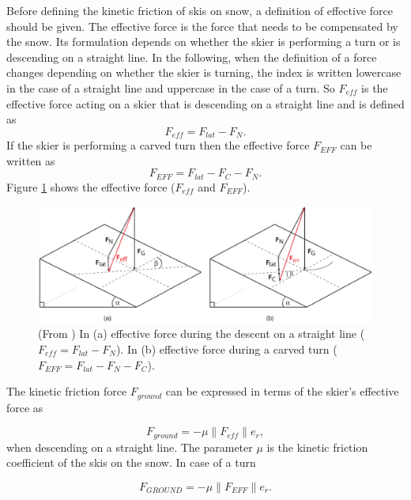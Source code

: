 \documentclass[12pt,a4paper,twoside]{book}
\newcommand{\norm}[1]{\lVert#1\rVert}
\begin{document}
Before defining the kinetic friction of skis on snow, a definition of effective force should be given. The effective force is the force that needs to be compensated by the snow. Its formulation depends on whether the skier is performing a turn or is descending on a straight line. In the following, when the definition of a force changes depending on whether the skier is turning, the index is written lowercase in the case of a straight line and uppercase in the case of a turn. So $F_{eff}$ is the effective force acting on a skier that is descending on a straight line and is defined as
\begin{equation}
F_{eff}=F_{lat}-F_N.
\end{equation}
If the skier is performing a carved turn then the effective force $F_{EFF}$ can be written as
\begin{equation}
F_{EFF}=F_{lat}-F_C-F_N.
\end{equation}
Figure \ref{effective_force_pic} shows the effective force ($F_{eff}$ and $F_{EFF}$).

\begin{figure}
  \begin{center}
    \includegraphics[width=\textwidth]{images/figure6.eps}
    \caption{(From \cite{hol2012}) In (a) effective force during the descent on a straight line ($F_{eff}=F_{lat}-F_N$). In (b) effective force during a carved turn ($F_{EFF}=F_{lat}-F_N-F_C$).}\label{effective_force_pic}
  \end{center}
\end{figure}

The kinetic friction force $F_{ground}$ can be expressed in terms of the skier's effective force as

\begin{equation}
F_{ground}=-\mu \norm{F_{eff}}e_{\dot{r}},
\end{equation}
when descending on a straight line. The parameter $\mu$ is the kinetic friction coefficient of the skis on the snow. In case of a turn

\begin{equation}
F_{GROUND}=-\mu \norm{F_{EFF}}e_{\dot{r}}.
\end{equation}
\end{document}
